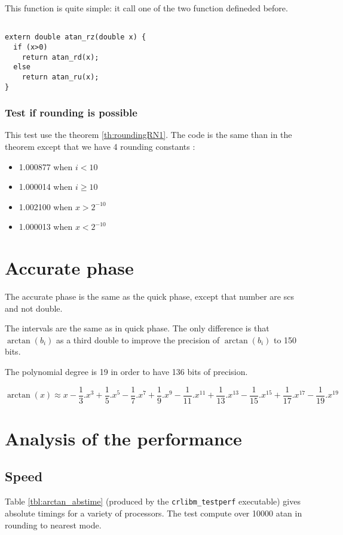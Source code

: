 This function is quite simple: it call one of the two function defineded
before.

\begin{lstlisting}[caption={Rounding to zero},firstnumber=&]

extern double atan_rz(double x) {
  if (x>0)
    return atan_rd(x);
  else
    return atan_ru(x);
}
\end{lstlisting}

\subsubsection{Test if rounding is possible}
This test use the theorem \ref{th:roundingRN1}.
The code is the same than in the theorem except that we have 4 rounding
constants : 
\begin{itemize}
\item 1.000877 when $i<10$
\item 1.000014 when $i\geq10$
\item 1.002100 when $x>2^{-10}$
\item 1.000013 when $x<2^{-10}$
\end{itemize}


\section{Accurate phase}
The accurate phase is the same as the quick phase, except that number are
scs and not double.

The intervals are the same as in quick phase. The only difference is that
$\arctan(b_i)$ as a third double to improve the precision of $\arctan(b_i)$ to
150 bits.

The polynomial degree is 19 in order to have 136 bits of precision.

\begin{equation} \arctan(x) \approx
x-\frac{1}{3}.x^3+\frac{1}{5}.x^5-\frac{1}{7}.x^7+\frac{1}{9}.x^9-\frac{1}{11}.x^{11}+\frac{1}{13}.x^{13}-\frac{1}{15}.x^{15}+\frac{1}{17}.x^{17}-\frac{1}{19}.x^{19}
\label{eq:arctan_scspoly}
\end{equation}

\section{Analysis of the performance}

\subsection{Speed}
Table \ref{tbl:arctan_abstime} (produced by the \texttt{crlibm\_testperf}
executable) gives absolute timings for a variety of processors. The test
compute over 10000 atan in rounding to nearest mode.

